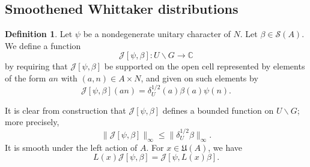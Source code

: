 \documentclass[reqno]{amsart}
\theoremstyle{plain} \newtheorem{theorem} {Theorem}
\theoremstyle{definition} \newtheorem{definition} [theorem] {Definition}
\theoremstyle{itplain} %
\numberwithin{equation}{section}
\numberwithin{theorem}{section}
\renewcommand{\leq}{\leqslant}
\begin{document}
\subsection{Smoothened Whittaker distributions}

\begin{definition}
Let $\psi$ be a nondegenerate unitary character of $N$.  Let $\beta \in \mathcal{S}(A)$.  We define a function 
\begin{equation*}
\mathcal{J}[\psi,\beta] : U \backslash G \rightarrow \mathbb{C}
\end{equation*}
by requiring that $\mathcal{J}[\psi,\beta]$ be supported on the open cell represented by elements of the form $a n$ with $(a,n) \in A \times N$, and given on such elements by
\begin{equation*}
\mathcal{J}[\psi,\beta](a n) = \delta_U^{1/2}(a) \beta(a) \psi(n).
\end{equation*}
\end{definition}
It is clear from construction that $\mathcal{J}[\psi,\beta]$ defines a bounded function on $U \backslash G$; more precisely,
\begin{equation}\label{eq:mathc-beta_-leq}
  \|\mathcal{J}[\psi,\beta]\|_{\infty} \leq \|\delta_U^{1/2} \beta \|_{\infty}.
\end{equation}
It is smooth under the left action of $A$.  For $x \in \mathfrak{U}(A)$, we have
\begin{equation}\label{eq:lx-mathcalj_psi-beta}
  L(x) \mathcal{J}[\psi,\beta] = \mathcal{J}[\psi,L(x) \beta].
\end{equation}
\end{document}
